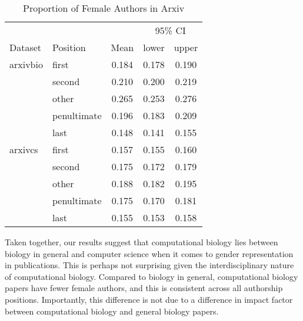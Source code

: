 \documentclass[10pt,letterpaper]{article}
\begin{document}
\begin{flushleft}
\begin{table}[]
\centering
\caption{Proportion of Female Authors in Arxiv}
\label{Table 3}
\begin{tabular}{llccc}
\toprule
        &                  &       & \multicolumn{2}{c}{95\% CI} \\
\cmidrule(r){4-5}
Dataset      & Position    & Mean  & lower        & upper        \\
\midrule
arxivbio     & first       & 0.184 & 0.178        & 0.190        \\
             & second      & 0.210 & 0.200        & 0.219        \\
             & other       & 0.265 & 0.253        & 0.276        \\
             & penultimate & 0.196 & 0.183        & 0.209        \\
             & last        & 0.148 & 0.141        & 0.155        \\
arxivcs      & first       & 0.157 & 0.155        & 0.160        \\
             & second      & 0.175 & 0.172        & 0.179        \\
             & other       & 0.188 & 0.182        & 0.195        \\
             & penultimate & 0.175 & 0.170        & 0.181        \\
             & last        & 0.155 & 0.153        & 0.158        \\
\bottomrule
\end{tabular}
\end{table}

Taken together, our results suggest that computational biology lies between biology in general and computer science when it comes to gender representation in publications. This is perhaps not surprising given the interdisciplinary nature of computational biology. Compared to biology in general, computational biology papers have fewer female authors, and this is consistent across all authorship positions. Importantly, this difference is not due to a difference in impact factor between computational biology and general biology papers.


\end{flushleft}
\end{document}
